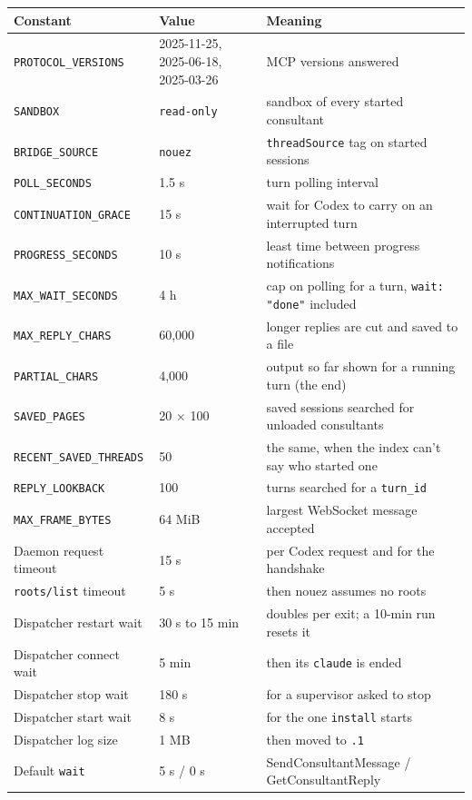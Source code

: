 \documentclass[10pt,a4paper]{article}
\newcommand{\code}[1]{\texttt{#1}}
\begin{document}
\begin{center}\small
\begin{tabular}{@{}l l l@{}}
\toprule
\textbf{Constant} & \textbf{Value} & \textbf{Meaning} \\
\midrule
\code{PROTOCOL\_VERSIONS} & 2025-11-25, 2025-06-18, 2025-03-26 & MCP versions answered \\
\code{SANDBOX} & \code{read-only} & sandbox of every started consultant \\
\code{BRIDGE\_SOURCE} & \code{nouez} & \code{threadSource} tag on started sessions \\
\code{POLL\_SECONDS} & 1.5 s & turn polling interval \\
\code{CONTINUATION\_GRACE} & 15 s & wait for Codex to carry on an interrupted turn \\
\code{PROGRESS\_SECONDS} & 10 s & least time between progress notifications \\
\code{MAX\_WAIT\_SECONDS} & 4 h & cap on polling for a turn, \code{wait: "done"} included \\
\code{MAX\_REPLY\_CHARS} & 60,000 & longer replies are cut and saved to a file \\
\code{PARTIAL\_CHARS} & 4,000 & output so far shown for a running turn (the end) \\
\code{SAVED\_PAGES} & 20 $\times$ 100 & saved sessions searched for unloaded consultants \\
\code{RECENT\_SAVED\_THREADS} & 50 & the same, when the index can't say who started one \\
\code{REPLY\_LOOKBACK} & 100 & turns searched for a \code{turn\_id} \\
\code{MAX\_FRAME\_BYTES} & 64 MiB & largest WebSocket message accepted \\
Daemon request timeout & 15 s & per Codex request and for the handshake \\
\code{roots/list} timeout & 5 s & then nouez assumes no roots \\
Dispatcher restart wait & 30 s to 15 min & doubles per exit; a 10-min run resets it \\
Dispatcher connect wait & 5 min & then its \code{claude} is ended \\
Dispatcher stop wait & 180 s & for a supervisor asked to stop \\
Dispatcher start wait & 8 s & for the one \code{install} starts \\
Dispatcher log size & 1 MB & then moved to \code{.1} \\
Default \code{wait} & 5 s / 0 s & SendConsultantMessage / GetConsultantReply \\

\end{tabular}
\end{center}
\end{document}
